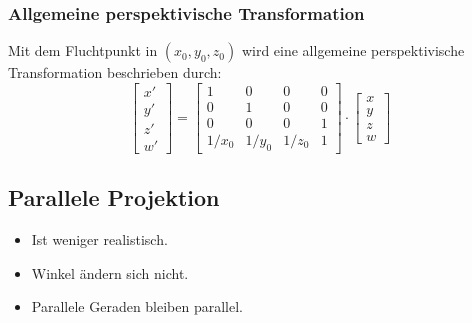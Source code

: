 			\subsubsection{Allgemeine perspektivische Transformation}
				Mit dem Fluchtpunkt in \( (x_0, y_0, z_0) \) wird eine allgemeine perspektivische Transformation beschrieben durch:
				\begin{equation*}
					\begin{bmatrix}
						x' \\
						y' \\
						z' \\
						w'
					\end{bmatrix}
					=
					\begin{bmatrix}
						1     & 0     & 0     & 0 \\
						0     & 1     & 0     & 0 \\
						0     & 0     & 0     & 1 \\
						1/x_0 & 1/y_0 & 1/z_0 & 1
					\end{bmatrix}
					\cdot
					\begin{bmatrix}
						x \\
						y \\
						z \\
						w
					\end{bmatrix}
				\end{equation*}

		\subsection{Parallele Projektion}
			\begin{itemize}
				\item Ist weniger realistisch.
				\item Winkel ändern sich \iA nicht.
				\item Parallele Geraden bleiben parallel.
			\end{itemize}
		
